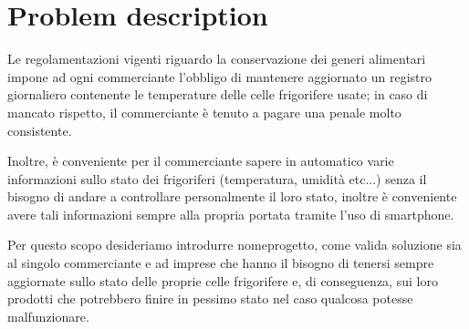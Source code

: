 \section{Problem description}\label{sec:prob_desc}
Le regolamentazioni vigenti riguardo la conservazione dei generi alimentari impone ad ogni commerciante l'obbligo di mantenere aggiornato un registro giornaliero contenente le temperature delle celle frigorifere usate; in caso di mancato rispetto, il commerciante è tenuto a pagare una penale molto consistente.
\vspace{3mm}

Inoltre, è conveniente per il commerciante sapere in automatico varie informazioni sullo stato dei frigoriferi (temperatura, umidità etc...) senza il bisogno di andare a controllare personalmente il loro stato, inoltre è conveniente avere tali informazioni sempre alla propria portata tramite l'uso di smartphone.

\vspace{3mm}

Per questo scopo desideriamo introdurre nomeprogetto, come valida soluzione sia al singolo commerciante e ad imprese che hanno il bisogno di tenersi sempre aggiornate sullo stato delle proprie celle frigorifere e, di conseguenza, sui loro prodotti che potrebbero finire in pessimo stato nel caso qualcosa potesse malfunzionare.

